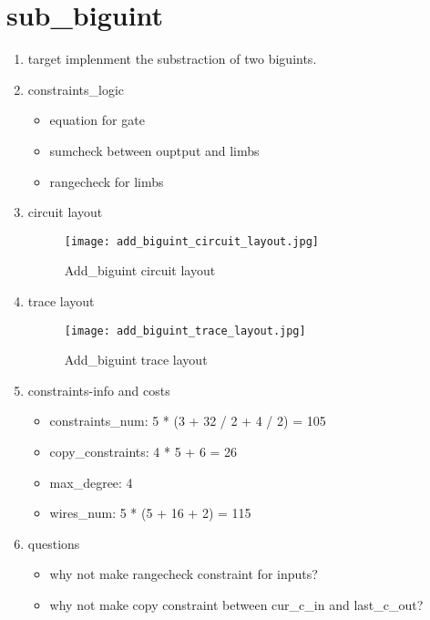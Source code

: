 \section{sub_biguint}
\label{sub_biguint}

\begin{enumerate}
    \item target
        implenment the substraction of two biguints.
    \item constraints_logic
        \begin{itemize}
            \item equation for gate
            \item sumcheck between ouptput and limbs
            \item rangecheck for limbs
        \end{itemize}
    \item circuit layout
        \begin{figure}[!ht]
            \centering
            \texttt{[image: add\_biguint\_circuit\_layout.jpg]}
            \caption{Add_biguint circuit layout}
            \label{fig:add_biguint_circuit_layout}
        \end{figure}

    \item trace layout
        \begin{figure}[!ht]
            \centering
            \texttt{[image: add\_biguint\_trace\_layout.jpg]}
            \caption{Add_biguint trace layout}
            \label{fig:add_biguint_trace_layout}
        \end{figure}
    
    \item constraints-info and costs
        \begin{itemize}
            \item constraints_num: 5 * (3 + 32 / 2 + 4 / 2) = 105
            \item copy_constraints: 4 * 5 + 6 = 26
            \item max_degree: 4
            \item wires_num: 5 * (5 + 16 + 2) = 115
        \end{itemize}

    \item questions
        \begin{itemize}
            \item why not make rangecheck constraint for inputs?
            \item why not make copy constraint between cur_c_in and last_c_out?
        \end{itemize}

\end{enumerate}
